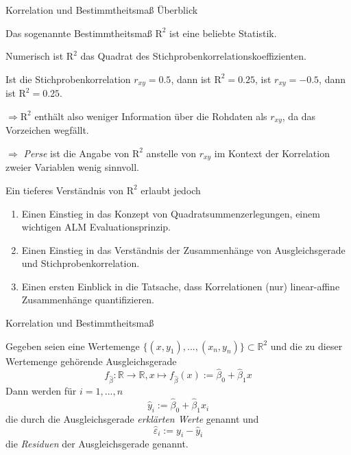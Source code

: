 \documentclass[
  8pt,
  ignorenonframetext,
]{beamer}
\providecommand{\tightlist}{%
  \setlength{\itemsep}{0pt}\setlength{\parskip}{0pt}}
\begin{document}
\begin{frame}{Korrelation und Bestimmtheitsmaß}
\protect\hypertarget{korrelation-und-bestimmtheitsmauxdf}{}
Überblick  \footnotesize

Das sogenannte Bestimmtheitsmaß \(\mbox{R}^2\) ist eine beliebte
Statistik.

Numerisch ist \(\mbox{R}^2\) das Quadrat des
Stichprobenkorrelationskoeffizienten.

Ist die Stichprobenkorrelation \(r_{xy} = 0.5\), dann ist
\(\mbox{R}^2 = 0.25\), ist \(r_{xy} = -0.5\), dann ist
\(\mbox{R}^2 = 0.25\).

\(\Rightarrow \mbox{R}^2\) enthält also weniger Information über die
Rohdaten als \(r_{xy}\), da das Vorzeichen wegfällt.

\(\Rightarrow\) \textit{Perse} ist die Angabe von \(\mbox{R}^2\)
anstelle von \(r_{xy}\) im Kontext der Korrelation zweier Variablen
wenig sinnvoll.

Ein tieferes Verständnis von \(\mbox{R}^2\) erlaubt jedoch

\begin{enumerate}
[(1)]
\tightlist
\item
  Einen Einstieg in das Konzept von Quadratsummenzerlegungen, einem
  wichtigen ALM Evaluationsprinzip.
\item
  Einen Einstieg in das Verständnis der Zusammenhänge von
  Ausgleichsgerade und Stichprobenkorrelation.
\item
  Einen ersten Einblick in die Tatsache, dass Korrelationen (nur)
  linear-affine Zusammenhänge quantifizieren.
\end{enumerate}
\end{frame}

\begin{frame}{Korrelation und Bestimmtheitsmaß}
\protect\hypertarget{korrelation-und-bestimmtheitsmauxdf-1}{}
\small
\begin{definition}
\justifying
Gegeben seien eine Wertemenge $\{(x,y_1), ..., (x_n,y_n)\} \subset \mathbb{R}^2$
und die zu dieser Wertemenge gehörende Ausgleichsgerade
\begin{equation}
f_{\hat{\beta}} : \mathbb{R} \to \mathbb{R}, x \mapsto f_{\hat{\beta}}(x) := \hat{\beta}_0 + \hat{\beta}_1x
\end{equation}
Dann werden für $i = 1,...,n$
\begin{equation}
\hat{y}_i := \hat{\beta}_0 + \hat{\beta}_1x_i
\end{equation}
die durch die Ausgleichsgerade \textit{erklärten Werte} genannt und
\begin{equation}
\hat{\varepsilon}_i := y_i - \hat{y}_i
\end{equation}
die \textit{Residuen} der Ausgleichsgerade genannt.
\end{definition}
\end{frame}
\end{document}
